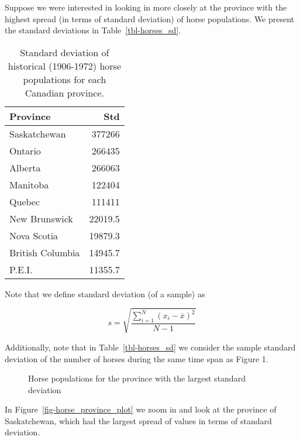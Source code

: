 \documentclass[
  letterpaper,
  DIV=11,
  numbers=noendperiod]{scrartcl}
\begin{document}
Suppose we were interested in looking in more closely at the province
with the highest spread (in terms of standard deviation) of horse
populations. We present the standard deviations in
Table~\ref{tbl-horses_sd}.

\begin{longtable}[]{@{}lr@{}}

\caption{\label{tbl-horses\_sd}Standard deviation of historical
(1906-1972) horse populations for each Canadian province.}

\tabularnewline

\toprule\noalign{}
Province & Std \\
\midrule\noalign{}
\endhead
\bottomrule\noalign{}
\endlastfoot
Saskatchewan & 377266 \\
Ontario & 266435 \\
Alberta & 266063 \\
Manitoba & 122404 \\
Quebec & 111411 \\
New Brunswick & 22019.5 \\
Nova Scotia & 19879.3 \\
British Columbia & 14945.7 \\
P.E.I. & 11355.7 \\

\end{longtable}

Note that we define standard deviation (of a sample) as

\[s = \sqrt{\frac{\sum_{i=1}^N (x_i - \overline{x})^2}{N-1} }\]

Additionally, note that in Table~\ref{tbl-horses_sd} we consider the
sample standard deviation of the number of horses during the same time
span as Figure 1.

\begin{figure}


\caption{\label{fig-horse\_province\_plot}Horse populations for the
province with the largest standard deviation}

\end{figure}%

In Figure~\ref{fig-horse_province_plot} we zoom in and look at the
province of Saskatchewan, which had the largest spread of values in
terms of standard deviation.
\end{document}
